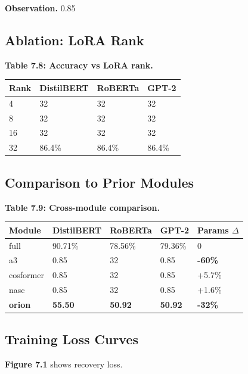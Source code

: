 \textbf{Observation.} 0.85

\subsection{Ablation: LoRA Rank}

\textbf{Table 7.8: Accuracy vs LoRA rank.}

\begin{table}[H]
\centering
\small
\begin{tabular}{llll}
\toprule
\textbf{Rank} & \textbf{DistilBERT} & \textbf{RoBERTa} & \textbf{GPT-2} \\
\midrule
4 & 32 & 32 & 32 \\
8 & 32 & 32 & 32 \\
16 & 32 & 32 & 32 \\
32 & 86.4\% & 86.4\% & 86.4\% \\
\bottomrule
\end{tabular}
\end{table}

\subsection{Comparison to Prior Modules}

\textbf{Table 7.9: Cross-module comparison.}

\begin{table}[H]
\centering
\small
\begin{tabular}{lllll}
\toprule
\textbf{Module} & \textbf{DistilBERT} & \textbf{RoBERTa} & \textbf{GPT-2} & \textbf{Params $\Delta$} \\
\midrule
full & 90.71\% & 78.56\% & 79.36\% & 0 \\
a3 & 0.85 & 32 & 0.85 & \textbf{-60\%} \\
cosformer & 0.85 & 32 & 0.85 & +5.7\% \\
nasc & 0.85 & 32 & 0.85 & +1.6\% \\
\textbf{orion} & \textbf{55.50} & \textbf{50.92} & \textbf{50.92} & \textbf{-32\%} \\
\bottomrule
\end{tabular}
\end{table}

\subsection{Training Loss Curves}

\textbf{Figure 7.1} shows recovery loss.

